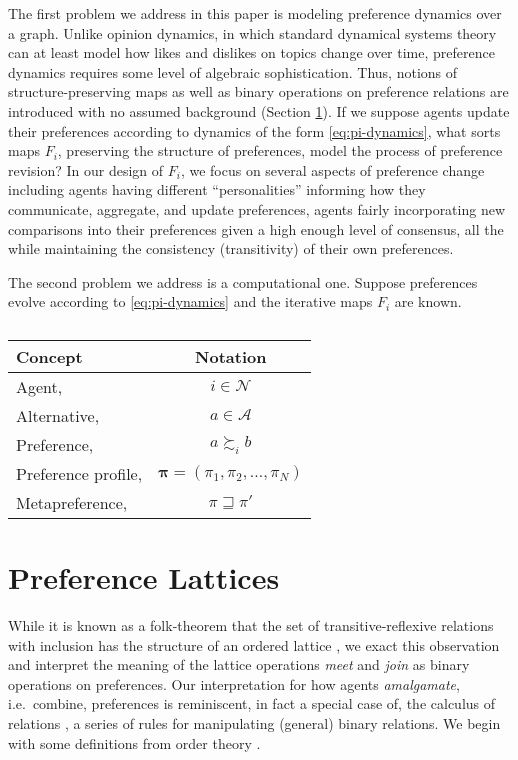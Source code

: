 \documentclass[conference]{ieeeconf}
\newcommand{\N}{\mathcal{N}}
\newcommand{\A}{\mathcal{A}}
\newcommand{\prefers}{\succsim}
\newcommand{\profile}{\boldsymbol{\pi}}
\newcommand{\metaprefers}{\sqsupseteq}
\begin{document}
The first problem we address in this paper is modeling preference dynamics over a graph. Unlike opinion dynamics, in which standard dynamical systems theory can at least model how likes and dislikes on topics change over time, preference dynamics requires some level of algebraic sophistication. Thus, notions of structure-preserving maps as well as binary operations on preference relations are introduced with no assumed background (Section \ref{sec:lattices}). If we suppose agents update their preferences according to dynamics of the form \eqref{eq:pi-dynamics}, what sorts maps $F_i$, preserving the structure of preferences, model the process of preference revision? In our design of $F_i$, we focus on several aspects of preference change including agents having different ``personalities'' informing how they communicate, aggregate, and update preferences, agents fairly incorporating new comparisons into their preferences given a high enough level of consensus, all the while maintaining the consistency (transitivity) of their own preferences.

The second problem we address is a computational one. Suppose preferences evolve according to \eqref{eq:pi-dynamics} and the iterative maps $F_i$ are known.



\begin{table}
\centering
\caption{}
\label{table:notation}
\begin{tabular}{p{5cm}c}
\toprule
Concept & Notation \\
\midrule
Agent, & $i \in \N$ \\
Alternative, & $a \in \A$ \\
Preference, & $a \prefers_i b$ \\
Preference profile, & $\profile = \left(\pi_1,\pi_2,\dots,\pi_N\right)$ \\
Metapreference, & $\pi \metaprefers \pi'$ \\
\bottomrule
\end{tabular}
\end{table}

\section{Preference Lattices}
\label{sec:lattices}

While it is known as a folk-theorem that the set of transitive-reflexive relations with inclusion has the structure of an ordered lattice \cite{birkhoff1940}, we exact this observation and interpret the meaning of the lattice operations \emph{meet} and \emph{join} as binary operations on preferences. Our interpretation for how agents \emph{amalgamate}, i.e.~combine, preferences is reminiscent, in fact a special case of, the calculus of relations \cite{tarski1941}, a series of rules for manipulating (general) binary relations. We begin with some definitions from order theory \cite{roman}.
\end{document}
